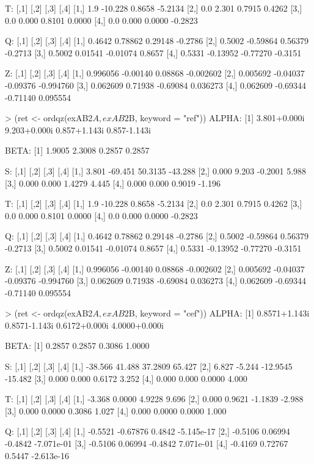 \begin{Code}[title=QZ demo ex3\_ordqz]
T:
     [,1]    [,2]   [,3]    [,4]
[1,]  1.9 -10.228 0.8658 -5.2134
[2,]  0.0   2.301 0.7915  0.4262
[3,]  0.0   0.000 0.8101  0.0000
[4,]  0.0   0.000 0.0000 -0.2823

Q:
       [,1]     [,2]     [,3]    [,4]
[1,] 0.4642  0.78862  0.29148 -0.2786
[2,] 0.5002 -0.59864  0.56379 -0.2713
[3,] 0.5002  0.01541 -0.01074  0.8657
[4,] 0.5331 -0.13952 -0.77270 -0.3151

Z:
         [,1]     [,2]     [,3]      [,4]
[1,] 0.996056 -0.00140  0.08868 -0.002602
[2,] 0.005692 -0.04037 -0.09376 -0.994760
[3,] 0.062609  0.71938 -0.69084  0.036273
[4,] 0.062609 -0.69344 -0.71140  0.095554

> (ret <- ordqz(exAB2$A, exAB2$B, keyword = "ref"))
ALPHA:
[1] 3.801+0.000i 9.203+0.000i 0.857+1.143i 0.857-1.143i

BETA:
[1] 1.9005 2.3008 0.2857 0.2857

S:
      [,1]    [,2]    [,3]    [,4]
[1,] 3.801 -69.451 50.3135 -43.288
[2,] 0.000   9.203 -0.2001   5.988
[3,] 0.000   0.000  1.4279   4.445
[4,] 0.000   0.000  0.9019  -1.196

T:
     [,1]    [,2]   [,3]    [,4]
[1,]  1.9 -10.228 0.8658 -5.2134
[2,]  0.0   2.301 0.7915  0.4262
[3,]  0.0   0.000 0.8101  0.0000
[4,]  0.0   0.000 0.0000 -0.2823

Q:
       [,1]     [,2]     [,3]    [,4]
[1,] 0.4642  0.78862  0.29148 -0.2786
[2,] 0.5002 -0.59864  0.56379 -0.2713
[3,] 0.5002  0.01541 -0.01074  0.8657
[4,] 0.5331 -0.13952 -0.77270 -0.3151

Z:
         [,1]     [,2]     [,3]      [,4]
[1,] 0.996056 -0.00140  0.08868 -0.002602
[2,] 0.005692 -0.04037 -0.09376 -0.994760
[3,] 0.062609  0.71938 -0.69084  0.036273
[4,] 0.062609 -0.69344 -0.71140  0.095554

> (ret <- ordqz(exAB2$A, exAB2$B, keyword = "cef"))
ALPHA:
[1] 0.8571+1.143i 0.8571-1.143i 0.6172+0.000i 4.0000+0.000i

BETA:
[1] 0.2857 0.2857 0.3086 1.0000

S:
        [,1]   [,2]     [,3]    [,4]
[1,] -38.566 41.488  37.2809  65.427
[2,]   6.827 -5.244 -12.9545 -15.482
[3,]   0.000  0.000   0.6172   3.252
[4,]   0.000  0.000   0.0000   4.000

T:
       [,1]   [,2]    [,3]   [,4]
[1,] -3.368 0.0000  4.9228  9.696
[2,]  0.000 0.9621 -1.1839 -2.988
[3,]  0.000 0.0000  0.3086  1.027
[4,]  0.000 0.0000  0.0000  1.000

Q:
        [,1]     [,2]    [,3]       [,4]
[1,] -0.5521 -0.67876  0.4842 -5.145e-17
[2,] -0.5106  0.06994 -0.4842 -7.071e-01
[3,] -0.5106  0.06994 -0.4842  7.071e-01
[4,] -0.4169  0.72767  0.5447 -2.613e-16


\end{Code}
